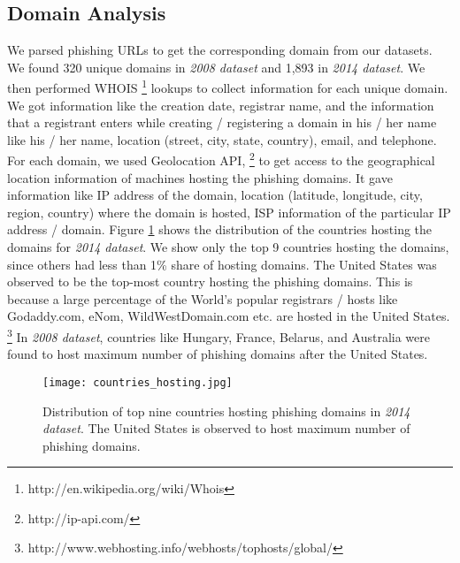 \documentclass[conference]{IEEEtran}
\begin{document}
\subsection{Domain Analysis}
We parsed phishing URLs to get the corresponding domain from our datasets. We found 320 unique domains in \textit{2008 dataset} and 1,893 in \textit{2014 dataset}. We then performed WHOIS \footnote{http://en.wikipedia.org/wiki/Whois} lookups to collect information for each unique domain. We got information like the creation date, registrar name, and the information that a registrant enters while creating / registering a domain in his / her name like his / her name, location (street, city, state, country), email, and telephone. For each domain, we used Geolocation API, \footnote{http://ip-api.com/} to get access to the geographical location information of machines hosting the phishing domains. It gave information like IP address of the domain, location (latitude, longitude, city, region, country) where the domain is hosted, ISP information of the particular IP address / domain. Figure \ref{fig:countries} shows the distribution of the countries hosting the domains for \textit{2014 dataset}. We show only the top 9 countries hosting the domains, since others had less than 1\% share of hosting domains. The United States was observed to be the top-most country hosting the phishing domains. This is because a large percentage of the World's popular registrars / hosts like Godaddy.com, eNom, WildWestDomain.com etc. are hosted in the United States. \footnote{http://www.webhosting.info/webhosts/tophosts/global/} In \textit{2008 dataset}, countries like Hungary, France, Belarus, and Australia were found to host maximum number of phishing domains after the United States.
\begin{figure}[h]
\centering
\texttt{[image: countries\_hosting.jpg]}
\caption{Distribution of top nine countries hosting phishing domains in \textit{2014 dataset}. The United States is observed to host maximum number of phishing domains.}
\label{fig:countries}
\end{figure}
\end{document}
